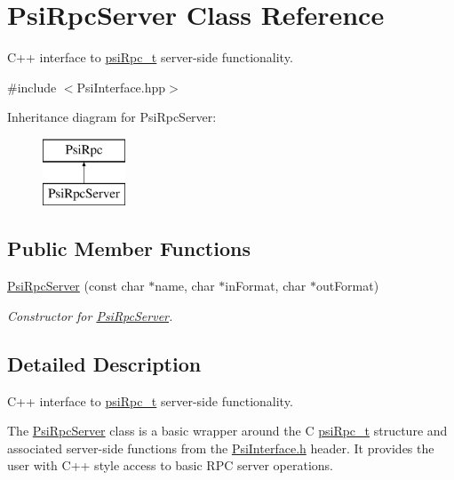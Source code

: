 \hypertarget{classPsiRpcServer}{}\section{Psi\+Rpc\+Server Class Reference}
\label{classPsiRpcServer}


C++ interface to \hyperlink{structpsiRpc__t}{psi\+Rpc\+\_\+t} server-\/side functionality.  




{\ttfamily \#include $<$Psi\+Interface.\+hpp$>$}

Inheritance diagram for Psi\+Rpc\+Server\+:\begin{figure}[H]
\begin{center}
\leavevmode
\includegraphics[height=2.000000cm]{classPsiRpcServer}
\end{center}
\end{figure}
\subsection*{Public Member Functions}
\begin{DoxyCompactItemize}
\item 
\hyperlink{classPsiRpcServer_ab59731cec82271493e4534e43d3756b7}{Psi\+Rpc\+Server} (const char $\ast$name, char $\ast$in\+Format, char $\ast$out\+Format)
\begin{DoxyCompactList}\small\item\em Constructor for \hyperlink{classPsiRpcServer}{Psi\+Rpc\+Server}. \end{DoxyCompactList}\end{DoxyCompactItemize}


\subsection{Detailed Description}
C++ interface to \hyperlink{structpsiRpc__t}{psi\+Rpc\+\_\+t} server-\/side functionality. 

The \hyperlink{classPsiRpcServer}{Psi\+Rpc\+Server} class is a basic wrapper around the C \hyperlink{structpsiRpc__t}{psi\+Rpc\+\_\+t} structure and associated server-\/side functions from the \hyperlink{PsiInterface_8h_source}{Psi\+Interface.\+h} header. It provides the user with C++ style access to basic R\+PC server operations. 

